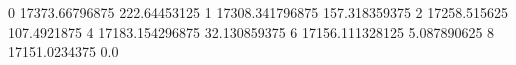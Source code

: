 0 17373.66796875 222.64453125
1 17308.341796875 157.318359375
2 17258.515625 107.4921875
4 17183.154296875 32.130859375
6 17156.111328125 5.087890625
8 17151.0234375 0.0
